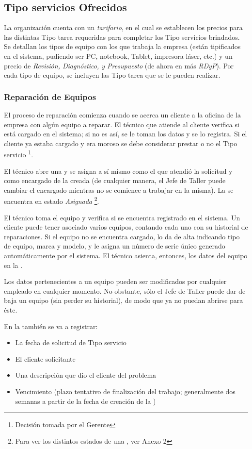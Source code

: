 \documentclass[12pt]{extarticle}
\begin{document}
\begin{spacing}{1.2}
    \pagebreak


    \subsection{Tipo servicios Ofrecidos}
    La organización cuenta con un \textit{tarifario}, en el cual se establecen los precios para las distintas Tipo tarea requeridas para completar los Tipo servicios brindados. Se detallan los tipos de equipo con los que trabaja la empresa (están tipificados en el sistema, pudiendo ser PC, notebook, Tablet, impresora láser, etc.) y un precio de \textit{Revisión, Diagnóstico, y Presupuesto} (de ahora en más \textit{RDyP}). Por cada tipo de equipo, se incluyen las Tipo tarea que se le pueden realizar.

    \subsubsection{Reparación de Equipos}
    El proceso de reparación comienza cuando se acerca un cliente a la oficina de la empresa con algún equipo a reparar. El técnico que atiende al cliente verifica si está cargado en el sistema; si no es así, se le toman los datos y se lo registra. Si el cliente ya estaba cargado y era moroso se debe considerar prestar o no el Tipo servicio \footnote{Decisión tomada por el Gerente}.
    
   El técnico abre una \OT{} y se asigna a sí mismo como el que atendió la solicitud y como encargado de la \OT{} creada (de cualquier manera, el Jefe de Taller puede cambiar el encargado mientras no se comience a trabajar en la misma). La \OT{} se encuentra en estado \textit{Asignada} \footnote{Para ver los distintos estados de una \OT{}, ver Anexo 2}. 

    El técnico toma el equipo y verifica si se encuentra registrado en el sistema. Un cliente puede tener asociado varios equipos, contando cada uno con su historial de reparaciones. Si el equipo no se encuentra cargado, lo da de alta indicando tipo de equipo, marca y modelo, y le asigna un número de serie único generado automáticamente por el sistema. El técnico asienta, entonces, los datos del equipo en la \OT{}.

    Los datos pertenecientes a un equipo pueden ser modificados por cualquier empleado en cualquier momento. No obstante, sólo el Jefe de Taller puede dar de baja un equipo (sin perder su historial), de modo que ya no puedan abrirse \OTs{} para éste.
   
    En la \OT{} también se va a registrar:
    \begin{itemize}
        \item La fecha de solicitud de Tipo servicio
        \item El cliente solicitante
        \item Una descripción que dio el cliente del problema
        \item Vencimiento (plazo tentativo de finalización del trabajo; generalmente dos semanas a partir de la fecha de creación de la \OT{})
    \end{itemize}


\end{spacing}
\end{document}
